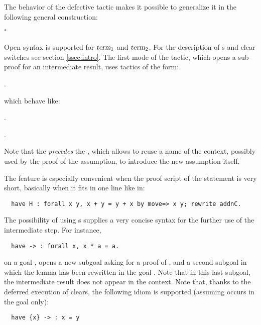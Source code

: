 \noindent{}


The behavior of the defective  tactic makes it possible to
generalize it in the
following general construction:
\begin{center}
	 $^*$ 
\end{center}

Open syntax is supported for $\ssrN[1]{term}$ and $\ssrN[2]{term}$. For the
description of
\iitem{}s and clear switches see section \ref{ssec:intro}.
The first mode of the  tactic, which opens a sub-proof for an
intermediate result, uses tactics of the form:

\begin{center}
     \ssrC{:} {\term}  {\tac}.
\end{center}

which behave like:\\

\begin{center}
   {\term}  {\tac}.
\end{center}
\begin{center}
    .
\end{center}


Note that the  \emph{precedes} the
, which allows to reuse a name of the context, possibly used
by the proof of the assumption, to introduce the new assumption
itself.

The  feature is especially convenient when the proof script of the
statement is very short, basically when it fits in one line like in:
\begin{lstlisting}
  have H : forall x y, x + y = y + x by move=> x y; rewrite addnC.
\end{lstlisting}

The possibility of using \iitem{}s supplies a very concise
syntax for the further use of the intermediate step. For instance,
\begin{lstlisting}
  have -> : forall x, x * a = a.
\end{lstlisting}
on a goal , opens a new subgoal asking for a proof of
, and a second subgoal in which the lemma
  has been rewritten in the goal . Note
 that in this last subgoal, the intermediate result does not appear in
 the context.
Note that, thanks to the deferred execution of clears, the following
idiom is supported (assuming  occurs in the goal only):
\begin{lstlisting}
  have {x} -> : x = y
\end{lstlisting}


